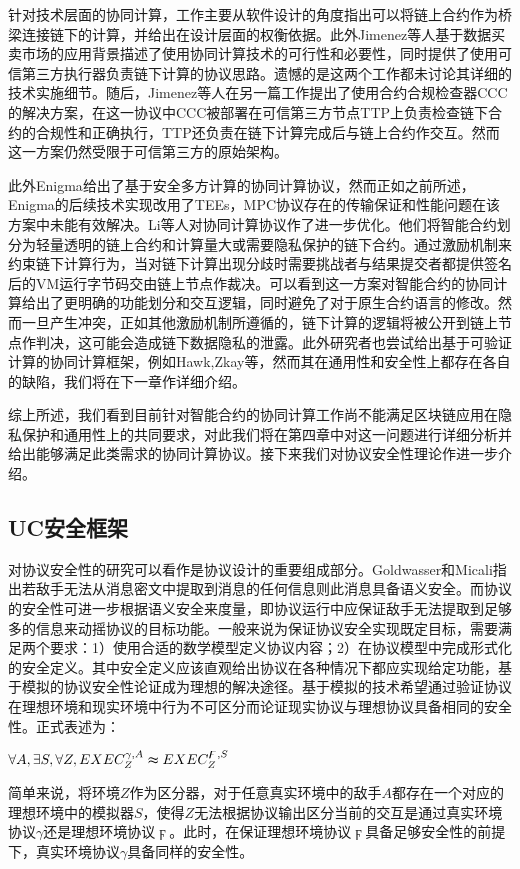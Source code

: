 针对技术层面的协同计算，工作\cite{7516828}主要从软件设计的角度指出可以将链上合约作为桥梁连接链下的计算，并给出在设计层面的权衡依据。此外Jimenez等人\cite{10.1007/978-3-030-10549-5_27}基于数据买卖市场的应用背景描述了使用协同计算技术的可行性和必要性，同时提供了使用可信第三方执行器负责链下计算的协议思路。遗憾的是这两个工作都未讨论其详细的技术实施细节。随后，Jimenez等人在另一篇工作\cite{molina2018implementation}提出了使用合约合规检查器CCC\cite{CCC}的解决方案，在这一协议中CCC被部署在可信第三方节点TTP上负责检查链下合约的合规性和正确执行，TTP还负责在链下计算完成后与链上合约作交互。然而这一方案仍然受限于可信第三方的原始架构。

此外Enigma\cite{2015arXiv150603471Z}给出了基于安全多方计算的协同计算协议，然而正如之前所述，Enigma的后续技术实现改用了TEEs，MPC协议存在的传输保证和性能问题在该方案中未能有效解决。Li等人\cite{li2019scalable}对协同计算协议作了进一步优化。他们将智能合约划分为轻量透明的链上合约和计算量大或需要隐私保护的链下合约。通过激励机制来约束链下计算行为，当对链下计算出现分歧时需要挑战者与结果提交者都提供签名后的VM运行字节码交由链上节点作裁决。可以看到这一方案对智能合约的协同计算给出了更明确的功能划分和交互逻辑，同时避免了对于原生合约语言的修改。然而一旦产生冲突，正如其他激励机制所遵循的，链下计算的逻辑将被公开到链上节点作判决，这可能会造成链下数据隐私的泄露。此外研究者也尝试给出基于可验证计算的协同计算框架，例如Hawk\cite{7546538},Zkay\cite{2020arXiv200901020B}等，然而其在通用性和安全性上都存在各自的缺陷，我们将在下一章作详细介绍。

综上所述，我们看到目前针对智能合约的协同计算工作尚不能满足区块链应用在隐私保护和通用性上的共同要求，对此我们将在第四章中对这一问题进行详细分析并给出能够满足此类需求的协同计算协议。接下来我们对协议安全性理论作进一步介绍。
\subsection{UC安全框架}
对协议安全性的研究可以看作是协议设计的重要组成部分。Goldwasser和Micali\cite{10.1145/800070.802212}指出若敌手无法从消息密文中提取到消息的任何信息则此消息具备语义安全。而协议的安全性可进一步根据语义安全来度量，即协议运行中应保证敌手无法提取到足够多的信息来动摇协议的目标功能。一般来说为保证协议安全实现既定目标，需要满足两个要求：1）使用合适的数学模型定义协议内容；2）在协议模型中完成形式化的安全定义。其中安全定义应该直观给出协议在各种情况下都应实现给定功能，基于模拟的协议安全性论证成为理想的解决途径。基于模拟的技术\cite{10.1145/22145.22178}希望通过验证协议在理想环境和现实环境中行为不可区分而论证现实协议与理想协议具备相同的安全性。正式表述为：
\begin{center}
    $\forall A, \exists S, \forall Z, EXEC^{\gamma, A}_Z \thickapprox EXEC^{\digamma, S}_Z$\cite{cryptoeprint:2007/102}
\end{center}
简单来说，将环境$Z$作为区分器，对于任意真实环境中的敌手$A$都存在一个对应的理想环境中的模拟器$S$，使得$Z$无法根据协议输出区分当前的交互是通过真实环境协议$\gamma$还是理想环境协议$\digamma$。此时，在保证理想环境协议$\digamma$具备足够安全性的前提下，真实环境协议$\gamma$具备同样的安全性。

